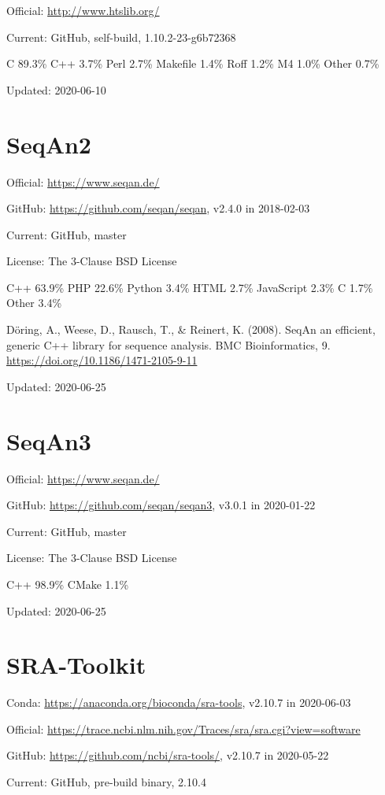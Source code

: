 \documentclass[]{article}
\begin{document}
Official: \url{http://www.htslib.org/}

Current: GitHub, self-build,  1.10.2-23-g6b72368

C 89.3\% C++ 3.7\% Perl 2.7\% Makefile 1.4\% Roff 1.2\% M4 1.0\% Other 0.7\%

Updated: 2020-06-10

\section{SeqAn2}

Official: \url{https://www.seqan.de/}

GitHub: \url{https://github.com/seqan/seqan}, v2.4.0 in 2018-02-03

Current: GitHub, master

License: The 3-Clause BSD License

C++ 63.9\% PHP 22.6\% Python 3.4\% HTML 2.7\% JavaScript 2.3\% C 1.7\% Other 3.4\%

Döring, A., Weese, D., Rausch, T., \& Reinert, K. (2008). SeqAn an efficient, generic C++ library for sequence analysis. BMC Bioinformatics, 9. \url{https://doi.org/10.1186/1471-2105-9-11}

Updated: 2020-06-25

\section{SeqAn3}

Official: \url{https://www.seqan.de/}

GitHub: \url{https://github.com/seqan/seqan3}, v3.0.1 in 2020-01-22

Current: GitHub, master

License: The 3-Clause BSD License

C++ 98.9\% CMake 1.1\%

Updated: 2020-06-25

\section{SRA-Toolkit}

Conda: \url{https://anaconda.org/bioconda/sra-tools}, v2.10.7 in 2020-06-03

Official: \url{https://trace.ncbi.nlm.nih.gov/Traces/sra/sra.cgi?view=software}

GitHub: \url{https://github.com/ncbi/sra-tools/}, v2.10.7 in 2020-05-22

Current: GitHub, pre-build binary, 2.10.4
\end{document}
